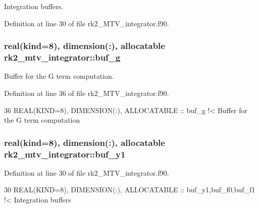 Integration buffers. 



Definition at line 30 of file rk2\+\_\+\+M\+T\+V\+\_\+integrator.\+f90.

\subsubsection[{\texorpdfstring{buf\+\_\+g}{buf_g}}]{\setlength{\rightskip}{0pt plus 5cm}real(kind=8), dimension(\+:), allocatable rk2\+\_\+mtv\+\_\+integrator\+::buf\+\_\+g\hspace{0.3cm}{\ttfamily [private]}}\hypertarget{namespacerk2__mtv__integrator_a9db4772c6d66fba1a175dc7c493c8c6d}{}\label{namespacerk2__mtv__integrator_a9db4772c6d66fba1a175dc7c493c8c6d}


Buffer for the G term computation. 



Definition at line 36 of file rk2\+\_\+\+M\+T\+V\+\_\+integrator.\+f90.


\begin{DoxyCode}
36   \textcolor{keywordtype}{REAL(KIND=8)}, \textcolor{keywordtype}{DIMENSION(:)}, \textcolor{keywordtype}{ALLOCATABLE} :: buf\_g\textcolor{comment}{                !< Buffer for the G term computation}
\end{DoxyCode}
\subsubsection[{\texorpdfstring{buf\+\_\+y1}{buf_y1}}]{\setlength{\rightskip}{0pt plus 5cm}real(kind=8), dimension(\+:), allocatable rk2\+\_\+mtv\+\_\+integrator\+::buf\+\_\+y1\hspace{0.3cm}{\ttfamily [private]}}\hypertarget{namespacerk2__mtv__integrator_aa33cc6702537576ce9327c8c1bacc0e0}{}\label{namespacerk2__mtv__integrator_aa33cc6702537576ce9327c8c1bacc0e0}


Definition at line 30 of file rk2\+\_\+\+M\+T\+V\+\_\+integrator.\+f90.


\begin{DoxyCode}
30   \textcolor{keywordtype}{REAL(KIND=8)}, \textcolor{keywordtype}{DIMENSION(:)}, \textcolor{keywordtype}{ALLOCATABLE} :: buf\_y1,buf\_f0,buf\_f1\textcolor{comment}{ !< Integration buffers}
\end{DoxyCode}
